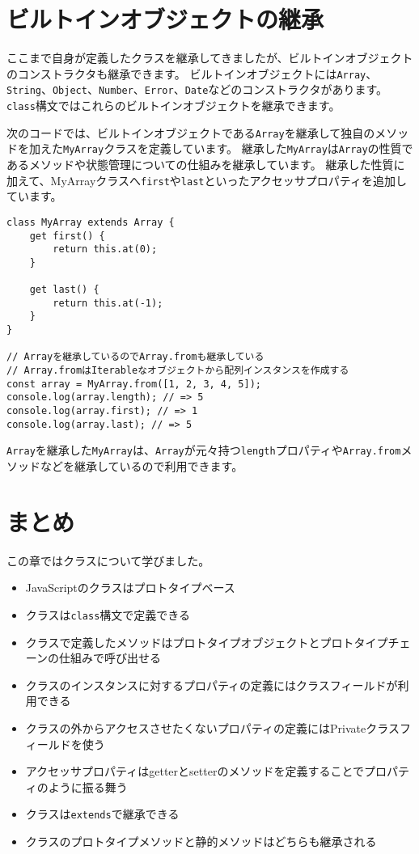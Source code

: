 \hypertarget{extends-built-in}{%
\section{ビルトインオブジェクトの継承}\label{extends-built-in}}

ここまで自身が定義したクラスを継承してきましたが、ビルトインオブジェクトのコンストラクタも継承できます。
ビルトインオブジェクトには\texttt{Array}、\texttt{String}、\texttt{Object}、\texttt{Number}、\texttt{Error}、\texttt{Date}などのコンストラクタがあります。
\texttt{class}構文ではこれらのビルトインオブジェクトを継承できます。

次のコードでは、ビルトインオブジェクトである\texttt{Array}を継承して独自のメソッドを加えた\texttt{MyArray}クラスを定義しています。
継承した\texttt{MyArray}は\texttt{Array}の性質であるメソッドや状態管理についての仕組みを継承しています。
継承した性質に加えて、MyArrayクラスへ\texttt{first}や\texttt{last}といったアクセッサプロパティを追加しています。

\begin{lstlisting}
class MyArray extends Array {
    get first() {
        return this.at(0);
    }

    get last() {
        return this.at(-1);
    }
}

// Arrayを継承しているのでArray.fromも継承している
// Array.fromはIterableなオブジェクトから配列インスタンスを作成する
const array = MyArray.from([1, 2, 3, 4, 5]);
console.log(array.length); // => 5
console.log(array.first); // => 1
console.log(array.last); // => 5
\end{lstlisting}

\texttt{Array}を継承した\texttt{MyArray}は、\texttt{Array}が元々持つ\texttt{length}プロパティや\texttt{Array.from}メソッドなどを継承しているので利用できます。

\hypertarget{conclusion}{%
\section{まとめ}\label{conclusion}}

この章ではクラスについて学びました。

\begin{itemize}
\item
  JavaScriptのクラスはプロトタイプベース
\item
  クラスは\texttt{class}構文で定義できる
\item
  クラスで定義したメソッドはプロトタイプオブジェクトとプロトタイプチェーンの仕組みで呼び出せる
\item
  クラスのインスタンスに対するプロパティの定義にはクラスフィールドが利用できる
\item
 クラスの外からアクセスさせたくないプロパティの定義にはPrivateクラスフィールドを使う
\item
  アクセッサプロパティはgetterとsetterのメソッドを定義することでプロパティのように振る舞う
\item
  クラスは\texttt{extends}で継承できる
\item
  クラスのプロトタイプメソッドと静的メソッドはどちらも継承される
\end{itemize}
